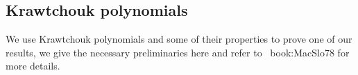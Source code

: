 \documentclass[11pt]{llncs}
\begin{document}










\subsection{Krawtchouk polynomials}
We use Krawtchouk polynomials and some of their properties to prove one of our results, we give the necessary preliminaries here and refer to \eg ~{book:MacSlo78} for more details.
\end{document}
